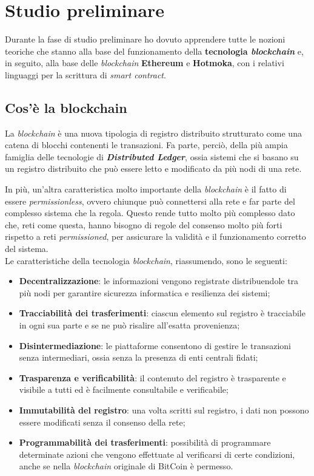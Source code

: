 
\section{Studio preliminare}
Durante la fase di studio preliminare ho dovuto apprendere tutte le nozioni teoriche che stanno alla base del funzionamento della \textbf{tecnologia \textit{blockchain}} e, in seguito, alla base delle \textit{blockchain} \textbf{Ethereum} e \textbf{Hotmoka}, con i relativi linguaggi per la scrittura di \textit{smart contract}.

\subsection{Cos'è la blockchain}
La \textit{blockchain} è una nuova tipologia di registro distribuito strutturato come una catena di blocchi contenenti le transazioni. Fa parte, perciò, della più ampia famiglia delle tecnologie di \textbf{\textit{Distributed Ledger}}, ossia sistemi che si basano su un registro distribuito che può essere letto e modificato da più nodi di una rete. 

In più, un'altra caratteristica molto importante della \textit{blockchain} è il fatto di essere \textit{permissionless}, ovvero chiunque può connettersi alla rete e far parte del complesso sistema che la regola. Questo rende tutto molto più complesso dato che, reti come questa, hanno bisogno di regole del consenso molto più forti rispetto a reti \textit{permissioned}, per assicurare la validità e il funzionamento corretto del sistema. \\

\noindent Le caratteristiche della tecnologia \textit{blockchain}, riassumendo, sono le seguenti:
\begin{itemize}
  \item \textbf{Decentralizzazione}: le informazioni vengono registrate distribuendole tra più nodi per garantire sicurezza informatica e resilienza dei sistemi;
  \item \textbf{Tracciabilità dei trasferimenti}: ciascun elemento sul registro è tracciabile in ogni sua parte e se ne può risalire all’esatta provenienza;
  \item \textbf{Disintermediazione}: le piattaforme consentono di gestire le transazioni senza intermediari, ossia senza la presenza di enti centrali fidati;
  \item \textbf{Trasparenza e verificabilità}: il contenuto del registro è trasparente e visibile a tutti ed è facilmente consultabile e verificabile;
  \item \textbf{Immutabilità del registro}: una volta scritti sul registro, i dati non possono essere modificati senza il consenso della rete;
  \item \textbf{Programmabilità dei trasferimenti}: possibilità di programmare determinate azioni che vengono effettuate al verificarsi di certe condizioni, anche se nella \textit{blockchain} originale di BitCoin è permesso.
\end{itemize}

